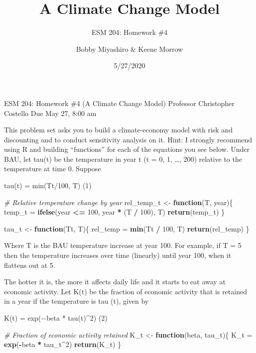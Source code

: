\documentclass[]{article}
\title{A Climate Change Model}
\subtitle{ESM 204: Homework \#4}
\author{Bobby Miyashiro \& Keene Morrow}
\date{5/27/2020}
\newenvironment{Shaded}{\begin{snugshade}}{\end{snugshade}}
\newcommand{\CommentTok}[1]{\textcolor[rgb]{0.56,0.35,0.01}{\textit{#1}}}
\newcommand{\ControlFlowTok}[1]{\textcolor[rgb]{0.13,0.29,0.53}{\textbf{#1}}}
\newcommand{\DecValTok}[1]{\textcolor[rgb]{0.00,0.00,0.81}{#1}}
\newcommand{\KeywordTok}[1]{\textcolor[rgb]{0.13,0.29,0.53}{\textbf{#1}}}
\newcommand{\NormalTok}[1]{#1}
\newcommand{\OperatorTok}[1]{\textcolor[rgb]{0.81,0.36,0.00}{\textbf{#1}}}
\newcommand{\StringTok}[1]{\textcolor[rgb]{0.31,0.60,0.02}{#1}}
\begin{document}
\maketitle

ESM 204: Homework \#4 (A Climate Change Model) Professor Christopher
Costello Due May 27, 8:00 am

This problem set asks you to build a climate-economy model with risk and
discounting and to conduct sensitivity analysis on it. Hint: I strongly
recommend using R and building ``functions'' for each of the equations
you see below. Under BAU, let tau(t) be the temperature in year t (t =
0, 1, \ldots{}, 200) relative to the temperature at time 0. Suppose

tau(t) = min(Tt/100, T) (1)

\begin{Shaded}
\begin{Highlighting}[]
\CommentTok{# Relative temperature change by year}
\NormalTok{rel_temp_t <-}\StringTok{ }\ControlFlowTok{function}\NormalTok{(T, year)\{}
\NormalTok{  temp_t =}\StringTok{ }\KeywordTok{ifelse}\NormalTok{(year }\OperatorTok{<=}\StringTok{ }\DecValTok{100}\NormalTok{, year }\OperatorTok{*}\StringTok{ }\NormalTok{(T }\OperatorTok{/}\StringTok{ }\DecValTok{100}\NormalTok{), T)}
  \KeywordTok{return}\NormalTok{(temp_t)}
\NormalTok{\}}

\NormalTok{tau_t <-}\StringTok{ }\ControlFlowTok{function}\NormalTok{(Tt, T)\{}
\NormalTok{  rel_temp =}\StringTok{ }\KeywordTok{min}\NormalTok{(Tt }\OperatorTok{/}\StringTok{ }\DecValTok{100}\NormalTok{, T)}
  \KeywordTok{return}\NormalTok{(rel_temp)}
\NormalTok{\}}
\end{Highlighting}
\end{Shaded}

Where T is the BAU temperature increase at year 100. For example, if T =
5 then the temperature increases over time (linearly) until year 100,
when it flattens out at 5.

The hotter it is, the more it affects daily life and it starts to eat
away at economic activity. Let K(t) be the fraction of economic activity
that is retained in a year if the temperature is tau (t), given by

K(t) = exp(−beta * tau(t)\^{}2) (2)

\begin{Shaded}
\begin{Highlighting}[]
\CommentTok{# Fraction of economic activity retained}
\NormalTok{K_t <-}\StringTok{ }\ControlFlowTok{function}\NormalTok{(beta, tau_t)\{}
\NormalTok{  K_t =}\StringTok{ }\KeywordTok{exp}\NormalTok{(}\OperatorTok{-}\NormalTok{beta }\OperatorTok{*}\StringTok{ }\NormalTok{tau_t}\OperatorTok{^}\DecValTok{2}\NormalTok{)}
  \KeywordTok{return}\NormalTok{(K_t)}
\NormalTok{\}}
\end{Highlighting}
\end{Shaded}
\end{document}
